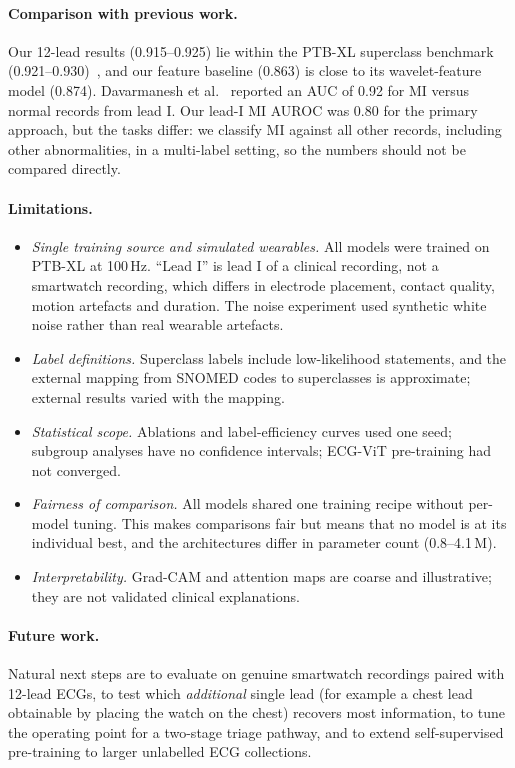 \paragraph{Comparison with previous work.} Our 12-lead results (0.915--0.925) lie within the PTB-XL superclass benchmark (0.921--0.930)~\cite{strodthoff2021benchmark}, and our feature baseline (0.863) is close to its wavelet-feature model (0.874). Davarmanesh et al.~\cite{davarmanesh2024leadI} reported an AUC of 0.92 for MI versus normal records from lead I. Our lead-I MI AUROC was 0.80 for the primary approach, but the tasks differ: we classify MI against all other records, including other abnormalities, in a multi-label setting, so the numbers should not be compared directly.

\paragraph{Limitations.}
\begin{itemize}
  \item \emph{Single training source and simulated wearables.} All models were trained on PTB-XL at 100\,Hz. ``Lead I'' is lead I of a clinical recording, not a smartwatch recording, which differs in electrode placement, contact quality, motion artefacts and duration. The noise experiment used synthetic white noise rather than real wearable artefacts.
  \item \emph{Label definitions.} Superclass labels include low-likelihood statements, and the external mapping from SNOMED codes to superclasses is approximate; external results varied with the mapping.
  \item \emph{Statistical scope.} Ablations and label-efficiency curves used one seed; subgroup analyses have no confidence intervals; ECG-ViT pre-training had not converged.
  \item \emph{Fairness of comparison.} All models shared one training recipe without per-model tuning. This makes comparisons fair but means that no model is at its individual best, and the architectures differ in parameter count (0.8--4.1\,M).
  \item \emph{Interpretability.} Grad-CAM and attention maps are coarse and illustrative; they are not validated clinical explanations.
\end{itemize}

\paragraph{Future work.} Natural next steps are to evaluate on genuine smartwatch recordings paired with 12-lead ECGs, to test which \emph{additional} single lead (for example a chest lead obtainable by placing the watch on the chest) recovers most information, to tune the operating point for a two-stage triage pathway, and to extend self-supervised pre-training to larger unlabelled ECG collections.
